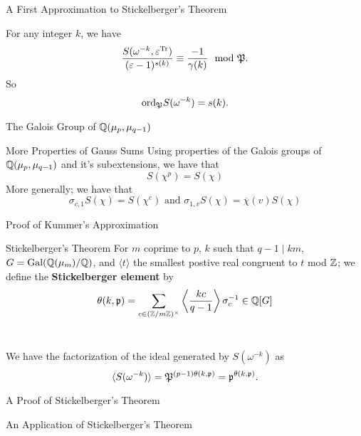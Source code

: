 \documentclass[presentation]{beamer}
\begin{document}
\begin{frame}{A First Approximation to Stickelberger's Theorem}
\begin{theorem}
For any integer $k$, we have \[\frac{S(\omega^{-k}, \varepsilon^{\textrm{Tr}})}{(\varepsilon - 1)^{s(k)}} \equiv \frac{-1}{\gamma(k)} \mod {\mathfrak{P}}.\]
So \[\textrm{ord}_{\mathfrak{P}} S(\omega^{-k} )= s(k).\]
\end{theorem}
\end{frame}

\begin{frame}{The Galois Group of $\mathbb{Q}(\mu_p, \mu_{q-1})$}

\end{frame}

\begin{frame}{More Properties of Gauss Sums }
Using properties of the Galois groups of $\mathbb{Q}(\mu_p, \mu_{q-1})$ and it's subextensions, we have that \[S(\chi^p) = S(\chi)\] More generally; we have that \[\sigma_{c,1}S(\chi) = S(\chi^c) \text{ and } \sigma_{1,v} S(\chi) = \overline{\chi}(v)S(\chi)\]
\end{frame}

\begin{frame}{Proof of Kummer's Approximation}

\end{frame}

\begin{frame}{Stickelberger's Theorem}
For $m$ coprime to $p$, $k$ such that $q-1 \mid km$, $G = \textrm{Gal}(\mathbb{Q}(\mu_m)/\mathbb{Q})$, and $\langle t \rangle$ the smallest postive real congruent to $t$ mod $\mathbb{Z}$; we define the \textbf{Stickelberger element} by \[\theta(k,\mathfrak{p}) = \sum_{c \in (\mathbb{Z}/m\mathbb{Z})^\times} \left \langle \frac{kc}{q-1}\right \rangle \sigma_c^{-1} \in \mathbb{Q}[G]\]
\\
\begin{theorem}
We have the factorization of the ideal generated by $S(\omega^{-k})$ as \[\langle S(\omega^{-k})\rangle = \mathfrak{P}^{(p-1)\theta(k, \mathfrak{p})} = \mathfrak{p}^{\theta(k,\mathfrak{p})}.\]
\end{theorem}
\end{frame}

\begin{frame}{A Proof of Stickelberger's Theorem}

\end{frame}

\begin{frame}{An Application of Stickelberger's Theorem}

\end{frame}
\end{document}
